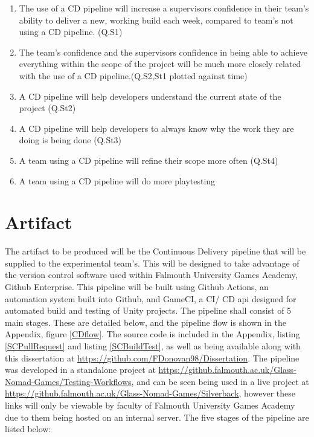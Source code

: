 \documentclass[journal]{IEEEtran}
\begin{document}
\begin{enumerate}
    \item \label{h_supconfidence} The use of a CD pipeline will increase a supervisors confidence in their team's ability to deliver a new, working build each week, compared to team's not using a CD pipeline. (Q.S1)
    \item \label{h_supteamconfidence} The team's confidence and the supervisors confidence in being able to achieve everything within the scope of the project will be much more closely related with the use of a CD pipeline.(Q.S2,St1 plotted against time)
    \item \label{h_projectstate} A CD pipeline will help developers understand the current state of the project (Q.St2)
    \item \label{h_workreason} A CD pipeline will help developers to always know why the work they are doing is being done (Q.St3)
    \item \label{h_scoperefine} A team using a CD pipeline will refine their scope more often (Q.St4)
    \item \label{h_playtesting} A team using a CD pipeline will do more playtesting
\end{enumerate}

\section{Artifact}
The artifact to be produced will be the Continuous Delivery pipeline that will be supplied to the experimental team's. This will be designed to take advantage of the version control software used within Falmouth University Games Academy, Github Enterprise\cite{gitenterprise}. This pipeline will be built using Github Actions\cite{gitactions}, an automation system built into Github, and GameCI\cite{gameci}, a CI/ CD api designed for automated build and testing of Unity projects. The pipeline shall consist of 5 main stages. These are detailed below, and the pipeline flow is shown in the Appendix, figure \ref{CDflow}. The source code is included in the Appendix, listing \ref{SCPullRequest} and listing \ref{SCBuildTest}, as well as being available along with this dissertation at \url{https://github.com/FDonovan98/Dissertation}. The pipeline was developed in a standalone project at \url{https://github.falmouth.ac.uk/Glass-Nomad-Games/Testing-Workflows}, and can be seen being used in a live project at \url{https://github.falmouth.ac.uk/Glass-Nomad-Games/Silverback}, however these links will only be viewable by faculty of Falmouth University Games Academy due to them being hosted on an internal server. The five stages of the pipeline are listed below:\\
\end{document}
